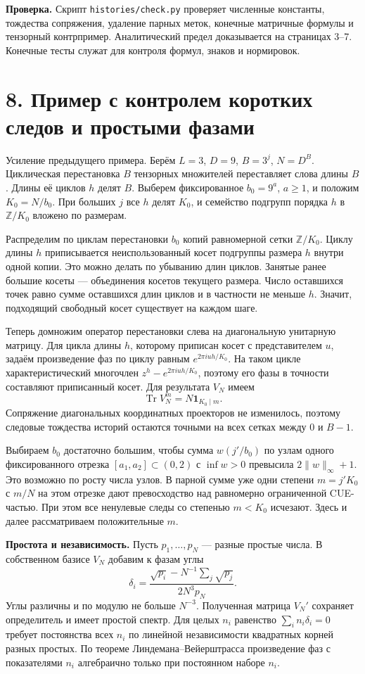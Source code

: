 \documentclass[11pt,a4paper]{article}
\newcommand{\Tr}{\operatorname{Tr}}
\newcommand{\Z}{\mathbb Z}
\newcommand{\sect}[1]{\section*{\sffamily\color{ink}#1}}
\newcommand{\subt}[1]{\par\medskip\noindent\textbf{#1.}\quad}
\begin{document}
\subt{Проверка}
Скрипт \texttt{histories/check.py} проверяет численные константы, тождества сопряжения, удаление парных меток, конечные матричные формулы и тензорный контрпример. Аналитический предел доказывается на страницах 3--7. Конечные тесты служат для контроля формул, знаков и нормировок.

\newpage
\sect{8. Пример с контролем коротких следов и простыми фазами}
Усиление предыдущего примера. Берём \(L=3\), \(D=9\), \(B=3^j\), \(N=D^B\).
Циклическая перестановка \(B\) тензорных множителей переставляет слова длины \(B\). Длины её циклов \(h\) делят \(B\). Выберем фиксированное \(b_0=9^a\), \(a\ge1\), и положим \(K_0=N/b_0\). При больших \(j\) все \(h\) делят \(K_0\), и семейство подгрупп порядка \(h\) в \(\Z/K_0\) вложено по размерам.

Распределим по циклам перестановки \(b_0\) копий равномерной сетки \(\Z/K_0\). Циклу длины \(h\) приписывается неиспользованный косет подгруппы размера \(h\) внутри одной копии. Это можно делать по убыванию длин циклов. Занятые ранее большие косеты — объединения косетов текущего размера. Число оставшихся точек равно сумме оставшихся длин циклов и в частности не меньше \(h\). Значит, подходящий свободный косет существует на каждом шаге.

Теперь домножим оператор перестановки слева на диагональную унитарную матрицу. Для цикла длины \(h\), которому приписан косет с представителем \(u\), задаём произведение фаз по циклу равным \(e^{2\pi i u h/K_0}\). На таком цикле характеристический многочлен \(z^h-e^{2\pi i u h/K_0}\), поэтому его фазы в точности составляют приписанный косет. Для результата \(V_N\) имеем
\[
    \Tr V_N^m=N\mathbf1_{K_0\mid m}.
\]
Сопряжение диагональных координатных проекторов не изменилось, поэтому следовые тождества историй остаются точными на всех сетках между 0 и \(B-1\).

Выбираем \(b_0\) достаточно большим, чтобы сумма \(w(j'/b_0)\) по узлам одного фиксированного отрезка \([a_1,a_2]\subset(0,2)\) с \(\inf w>0\) превысила \(2\|w\|_\infty+1\). Это возможно по росту числа узлов. В парной сумме уже одни степени \(m=j'K_0\) с \(m/N\) на этом отрезке дают превосходство над равномерно ограниченной CUE-частью. При этом все ненулевые следы со степенью \(m<K_0\) исчезают. Здесь и далее рассматриваем положительные \(m\).

\subt{Простота и независимость}
Пусть \(p_1,\ldots,p_N\) — разные простые числа. В собственном базисе \(V_N\) добавим к фазам углы
\[
             \delta_i=\frac{\sqrt{p_i}-N^{-1}\sum_j\sqrt{p_j}}{2N^3 p_N}.
\]
Углы различны и по модулю не больше \(N^{-3}\). Полученная матрица \(V_N'\) сохраняет определитель и имеет простой спектр. Для целых \(n_i\) равенство \(\sum_i n_i\delta_i=0\) требует постоянства всех \(n_i\) по линейной независимости квадратных корней разных простых. По теореме Линдемана--Вейерштрасса произведение фаз с показателями \(n_i\) алгебраично только при постоянном наборе \(n_i\).
\end{document}
